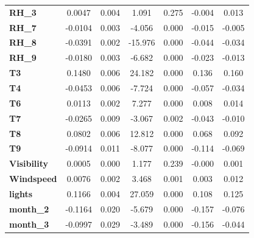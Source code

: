\begin{center}
\begin{table}[!h]
\begin{tabular}{lcccccc}
    \textbf{RH\_3}         &       0.0047  &        0.004     &     1.091  &         0.275        &       -0.004    &        0.013     \\
    \textbf{RH\_7}         &      -0.0104  &        0.003     &    -4.056  &         0.000        &       -0.015    &       -0.005     \\
    \textbf{RH\_8}         &      -0.0391  &        0.002     &   -15.976  &         0.000        &       -0.044    &       -0.034     \\
    \textbf{RH\_9}         &      -0.0180  &        0.003     &    -6.682  &         0.000        &       -0.023    &       -0.013     \\
    \textbf{T3}            &       0.1480  &        0.006     &    24.182  &         0.000        &        0.136    &        0.160     \\
    \textbf{T4}            &      -0.0453  &        0.006     &    -7.724  &         0.000        &       -0.057    &       -0.034     \\
    \textbf{T6}            &       0.0113  &        0.002     &     7.277  &         0.000        &        0.008    &        0.014     \\
    \textbf{T7}            &      -0.0265  &        0.009     &    -3.067  &         0.002        &       -0.043    &       -0.010     \\
    \textbf{T8}            &       0.0802  &        0.006     &    12.812  &         0.000        &        0.068    &        0.092     \\
    \textbf{T9}            &      -0.0914  &        0.011     &    -8.077  &         0.000        &       -0.114    &       -0.069     \\
    \textbf{Visibility}    &       0.0005  &        0.000     &     1.177  &         0.239        &       -0.000    &        0.001     \\
    \textbf{Windspeed}     &       0.0076  &        0.002     &     3.468  &         0.001        &        0.003    &        0.012     \\
    \textbf{lights}        &       0.1166  &        0.004     &    27.059  &         0.000        &        0.108    &        0.125     \\
    \textbf{month\_2}      &      -0.1164  &        0.020     &    -5.679  &         0.000        &       -0.157    &       -0.076     \\
    \textbf{month\_3}      &      -0.0997  &        0.029     &    -3.489  &         0.000        &       -0.156    &       -0.044     \\

\end{tabular}
\end{table}
\end{center}

